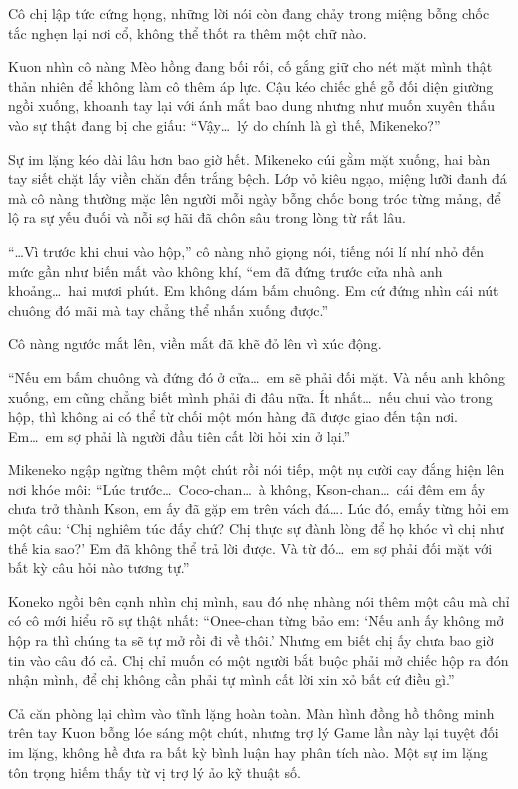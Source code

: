 ﻿\documentclass[../main.tex]{subfiles}
\begin{document}
Cô chị lập tức cứng họng, những lời nói còn đang chảy trong miệng bỗng chốc tắc nghẹn lại nơi cổ, không thể thốt ra thêm một chữ nào.

Kuon nhìn cô nàng Mèo hồng đang bối rối, cố gắng giữ cho nét mặt mình thật thản nhiên để không làm cô thêm áp lực. Cậu kéo chiếc ghế gỗ đối diện giường ngồi xuống, khoanh tay lại với ánh mắt bao dung nhưng như muốn xuyên thấu vào sự thật đang bị che giấu: ``Vậy\dots\ lý do chính là gì thế, Mikeneko?''

Sự im lặng kéo dài lâu hơn bao giờ hết. Mikeneko cúi gằm mặt xuống, hai bàn tay siết chặt lấy viền chăn đến trắng bệch. Lớp vỏ kiêu ngạo, miệng lưỡi đanh đá mà cô nàng thường mặc lên người mỗi ngày bỗng chốc bong tróc từng mảng, để lộ ra sự yếu đuối và nỗi sợ hãi đã chôn sâu trong lòng từ rất lâu.

``\dots Vì trước khi chui vào hộp,'' cô nàng nhỏ giọng nói, tiếng nói lí nhí nhỏ đến mức gần như biến mất vào không khí, ``em đã đứng trước cửa nhà anh khoảng\dots\ hai mươi phút. Em không dám bấm chuông. Em cứ đứng nhìn cái nút chuông đó mãi mà tay chẳng thể nhấn xuống được.''

Cô nàng ngước mắt lên, viền mắt đã khẽ đỏ lên vì xúc động.

``Nếu em bấm chuông và đứng đó ở cửa\dots\ em sẽ phải đối mặt. Và nếu anh không xuống, em cũng chẳng biết mình phải đi đâu nữa. Ít nhất\dots\ nếu chui vào trong hộp, thì không ai có thể từ chối một món hàng đã được giao đến tận nơi. Em\dots\ em sợ phải là người đầu tiên cất lời hỏi xin ở lại.''

Mikeneko ngập ngừng thêm một chút rồi nói tiếp, một nụ cười cay đắng hiện lên nơi khóe môi: ``Lúc trước\dots\ Coco-chan\dots\ à không, Kson-chan\dots\ cái đêm em ấy chưa trở thành Kson, em ấy đã gặp em trên vách đá\dots. Lúc đó, emấy từng hỏi em một câu: `Chị nghiêm túc đấy chứ? Chị thực sự đành lòng để họ khóc vì chị như thế kia sao?' Em đã không thể trả lời được. Và từ đó\dots\ em sợ phải đối mặt với bất kỳ câu hỏi nào tương tự.''

Koneko ngồi bên cạnh nhìn chị mình, sau đó nhẹ nhàng nói thêm một câu mà chỉ có cô mới hiểu rõ sự thật nhất: ``Onee-chan từng bảo em: `Nếu anh ấy không mở hộp ra thì chúng ta sẽ tự mở rồi đi về thôi.' Nhưng em biết chị ấy chưa bao giờ tin vào câu đó cả. Chị chỉ muốn có một người bắt buộc phải mở chiếc hộp ra đón nhận mình, để chị không cần phải tự mình cất lời xin xỏ bất cứ điều gì.''

Cả căn phòng lại chìm vào tĩnh lặng hoàn toàn. Màn hình đồng hồ thông minh trên tay Kuon bỗng lóe sáng một chút, nhưng trợ lý Game lần này lại tuyệt đối im lặng, không hề đưa ra bất kỳ bình luận hay phân tích nào. Một sự im lặng tôn trọng hiếm thấy từ vị trợ lý ảo kỹ thuật số.
\end{document}
